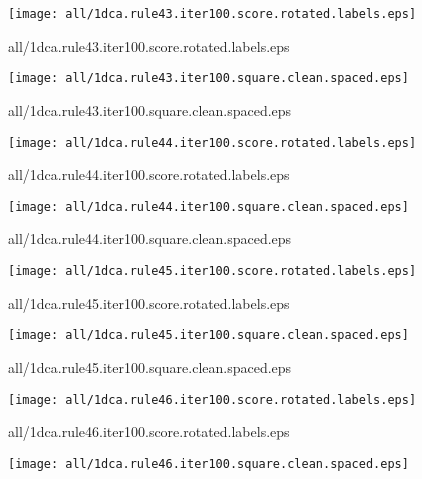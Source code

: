 \documentclass{article}
\begin{document}
\begin{center}
\begin{minipage}{\textwidth}
\texttt{[image: all/1dca.rule43.iter100.score.rotated.labels.eps]}
\end{minipage}
\end{center}
{\footnotesize all/1dca.rule43.iter100.score.rotated.labels.eps}
\begin{center}
\begin{minipage}{\textwidth}
\texttt{[image: all/1dca.rule43.iter100.square.clean.spaced.eps]}
\end{minipage}
\end{center}
{\footnotesize all/1dca.rule43.iter100.square.clean.spaced.eps}
\begin{center}
\begin{minipage}{\textwidth}
\texttt{[image: all/1dca.rule44.iter100.score.rotated.labels.eps]}
\end{minipage}
\end{center}
{\footnotesize all/1dca.rule44.iter100.score.rotated.labels.eps}
\begin{center}
\begin{minipage}{\textwidth}
\texttt{[image: all/1dca.rule44.iter100.square.clean.spaced.eps]}
\end{minipage}
\end{center}
{\footnotesize all/1dca.rule44.iter100.square.clean.spaced.eps}
\begin{center}
\begin{minipage}{\textwidth}
\texttt{[image: all/1dca.rule45.iter100.score.rotated.labels.eps]}
\end{minipage}
\end{center}
{\footnotesize all/1dca.rule45.iter100.score.rotated.labels.eps}
\begin{center}
\begin{minipage}{\textwidth}
\texttt{[image: all/1dca.rule45.iter100.square.clean.spaced.eps]}
\end{minipage}
\end{center}
{\footnotesize all/1dca.rule45.iter100.square.clean.spaced.eps}
\begin{center}
\begin{minipage}{\textwidth}
\texttt{[image: all/1dca.rule46.iter100.score.rotated.labels.eps]}
\end{minipage}
\end{center}
{\footnotesize all/1dca.rule46.iter100.score.rotated.labels.eps}
\begin{center}
\begin{minipage}{\textwidth}
\texttt{[image: all/1dca.rule46.iter100.square.clean.spaced.eps]}
\end{minipage}
\end{center}
\end{document}
